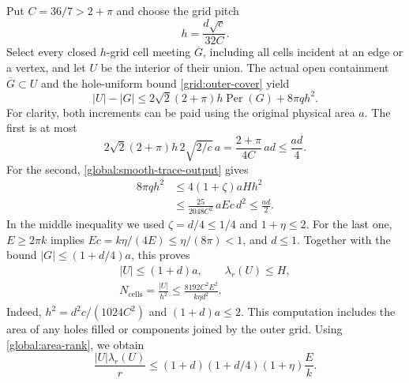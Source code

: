 \documentclass[11pt,reqno]{amsart}
\numberwithin{equation}{section}
\newcommand{\abs}[1]{\lvert#1\rvert}
\begin{document}
Put $C=36/7>2+\pi$ and choose the grid pitch
\begin{equation}
 h=\frac{d\sqrt c}{32C}.
 \label{global:grid-pitch}
\end{equation}
Select every closed $h$-grid cell meeting $\overline G$, including
all cells incident at an edge or a vertex, and let $U$ be the
interior of their union.  The actual open containment
$\overline G\subset U$ and the hole-uniform bound
\eqref{grid:outer-cover} yield
\begin{equation}
 \abs U-\abs G
 \leq 2\sqrt2(2+\pi)h\operatorname{Per}(G)+8\pi qh^2.
 \label{global:tube-budget}
\end{equation}
For clarity, both increments can be paid using the original
physical area $a$.  The first is at most
\[
 2\sqrt2(2+\pi)h\,2\sqrt{2/c}\,a
   =\frac{2+\pi}{4C}\,ad\leq\frac{ad}{4}.
\]
For the second, \eqref{global:smooth-trace-output} gives
\begin{align*}
 8\pi qh^2
   &\leq4(1+\zeta)aHh^2\\
   &\leq\frac{25}{2048C^2}\,aEc\,d^2
    \leq\frac{ad}{2}.
\end{align*}
In the middle inequality we used $\zeta=d/4\leq1/4$ and
$1+\eta\leq2$.  For the last one,
$E\geq2\pi k$ implies
$Ec=k\eta/(4E)\leq\eta/(8\pi)<1$, and $d\leq1$.
Together with the bound $\abs G\le(1+d/4)a$, this proves
\begin{equation}
 \begin{gathered}
 \abs U\leq(1+d)a,\qquad
 \lambda_r(U)\leq H,\\
 N_{\mathrm{cells}}
   =\frac{\abs U}{h^2}
   \leq\frac{8192C^2E^2}{k\eta d^2}.
 \end{gathered}
 \label{global:grid-count}
\end{equation}
Indeed, $h^2=d^2c/(1024C^2)$ and
$(1+d)a\leq2$.  This computation includes the area of any holes
filled or components joined by the outer grid.
Using \eqref{global:area-rank}, we obtain
\begin{equation}
 \frac{\abs U\lambda_r(U)}r
   \leq(1+d)(1+d/4)(1+\eta)\frac Ek.
 \label{global:trace-grid-ratio}
\end{equation}
\end{document}
